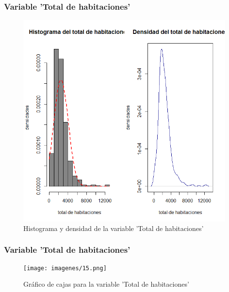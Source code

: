 \documentclass[12pt]{beamer}
\begin{document}
\begin{frame}
\frametitle{Variable 'Total de habitaciones'}
\begin{figure}[!h]
    \begin{center}
        \includegraphics[width=11cm]{imagenes/4.png}
        \caption{Histograma y densidad de la variable 'Total de habitaciones'}
        \label{fig:Densidad}
    \end{center}
\end{figure}
\end{frame}
\begin{frame}
\frametitle{Variable 'Total de habitaciones'}
\begin{figure}[!h]
    \begin{center}
        \texttt{[image: imagenes/15.png]}
        \caption{Gráfico de cajas para la variable 'Total de habitaciones'}
        \label{fig:Densidad}
    \end{center}
\end{figure}
\end{frame}
\end{document}
